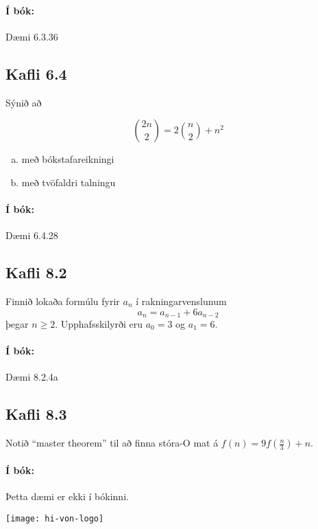 \documentclass{exam}
\begin{document}
\begin{questions}
\paragraph{Í bók:} Dæmi 6.3.36

\newpage
\subsection{Kafli 6.4}

\question Sýnið að

\[
 \binom{2n}{2} = 2\binom{n}{2} + n^2
\]

\begin{enumerate}[a)]
 \item með bókstafareikningi
 \item með tvöfaldri talningu
\end{enumerate}

\paragraph{Í bók:} Dæmi 6.4.28

\subsection{Kafli 8.2}

Finnið lokaða formúlu fyrir $a_n$ í rakningarvenslunum
\[
 a_n = a_{n-1} + 6a_{n-2}
\]
þegar $n \geq 2$. Upphafsskilyrði eru $a_0 = 3$ og $a_1 = 6$.

\paragraph{Í bók:} Dæmi 8.2.4a

\subsection{Kafli 8.3}

Notið ``master theorem'' til að finna stóra-O mat á $f(n) = 9f\left(\frac{n}{3}\right) + n$.

\paragraph{Í bók:} Þetta dæmi er ekki í bókinni.
\end{questions}

\vfill
\texttt{[image: hi-von-logo]}
\end{document}
